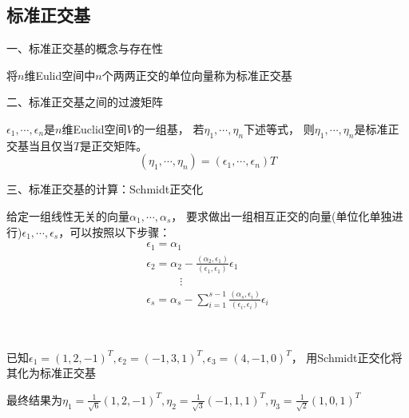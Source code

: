 \subsection{标准正交基}

\noindent 一、标准正交基的概念与存在性

\begin{definition}[标准正交基]
  将$n$维Eulid空间中$n$个两两正交的单位向量称为标准正交基
\end{definition}


\noindent 二、标准正交基之间的过渡矩阵

\begin{theorem}[标准正交基的过渡矩阵]
  $\epsilon_1,\cdots,\epsilon_n$是$n$维Euclid空间$V$的一组基，
  若$\eta_1,\cdots,\eta_n$下述等式，
  则$\eta_1,\cdots,\eta_n$是标准正交基当且仅当$T$是正交矩阵。
  \begin{equation*}
    (\eta_1,\cdots,\eta_n) = (\epsilon_1,\cdots,\epsilon_n)T
  \end{equation*}
\end{theorem}

\noindent 三、标准正交基的计算：Schmidt正交化

\begin{theorem}[Schmidt正交化]
  给定一组线性无关的向量$\alpha_1,\cdots,\alpha_s$，
  要求做出一组相互正交的向量(单位化单独进行)$\epsilon_1,\cdots,\epsilon_s$，可以按照以下步骤：
  \begin{equation*}
    \begin{array}{l}
      \epsilon_1 = \alpha_1\\
      \epsilon_2 = \alpha_2 - \frac{(\alpha_2,\epsilon_1)}{(\epsilon_1,\epsilon_1)}\epsilon_1\\
      \quad \quad \quad\vdots\\
      \epsilon_s = \alpha_s - \sum\limits_{i = 1}^{s-1}\frac{(\alpha_s, \epsilon_i)}{(\epsilon_i,\epsilon_i)}\epsilon_i
    \end{array}
  \end{equation*}
\end{theorem}

~

\begin{exercise}[Schmidt正交化]
  已知$\epsilon_1 = (1,2,-1)^T, \epsilon_2 = (-1,3,1)^T,\epsilon_3 = (4,-1,0)^T$，
  用Schmidt正交化将其化为标准正交基
\end{exercise}

\begin{solution}
  最终结果为$\eta_1 = \frac{1}{\sqrt{6}}(1,2,-1)^T, \eta_2 = \frac{1}{\sqrt{3}}(-1,1,1)^T, \eta_3 = \frac{1}{\sqrt{2}}(1,0,1)^T$
\end{solution}

